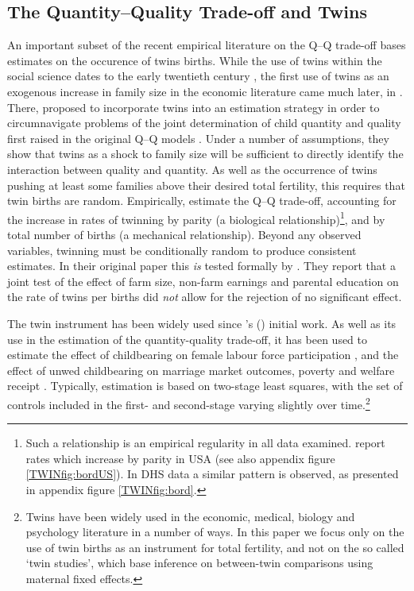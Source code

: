 \documentclass[subeqn]{article}
\begin{document}
\begin{spacing}{1.4}
\subsection{The Quantity--Quality Trade-off and Twins}
An important subset of the recent empirical literature on the Q--Q trade-off
bases estimates on the occurence of twins births.  While the use of twins within
the social science dates to the early twentieth century \citep{Thorndike1905}, the
first use of twins as an exogenous increase in family size in the economic
literature came much later, in \citet{RosenzweigWolpin1980}. There,
\citet{RosenzweigWolpin1980} proposed to incorporate twins into an estimation
strategy in order to circumnavigate problems of the joint determination of child 
quantity and quality first raised in the original Q--Q models \citep{BeckerLewis1973,
Willis1973,DeTray1973,BeckerTomes1976}.  Under a number of assumptions, they show 
that twins as a shock to family size will be sufficient to directly identify the 
interaction between quality and quantity.  As well as the occurrence of twins 
pushing at least some families above their desired total fertility, this requires 
that twin births are random.  Empirically, \citet{RosenzweigWolpin1980} 
estimate the Q--Q trade-off, accounting for the increase in rates of twinning by 
parity (a biological relationship)\footnote{Such a relationship is an empirical
  regularity in all data examined. \citet{RosenzweigWolpin1980} report rates which
  increase by parity in USA (see also appendix figure \ref{TWINfig:bordUS}).  In
  DHS data a similar pattern is observed, as presented in appendix figure
  \ref{TWINfig:bord}.}, and by total number of births (a mechanical relationship).
Beyond any observed variables, twinning must be conditionally random to produce
consistent estimates. In their original paper this \emph{is} tested formally by
\citet{RosenzweigWolpin1980}.  They report that a joint test of the effect of
farm size, non-farm earnings and parental education on the rate of twins per
births did \emph{not} allow for the rejection of no significant effect.

The twin instrument has been widely used since \citeauthor{RosenzweigWolpin1980}'s
(\citeyear{RosenzweigWolpin1980}) initial work. As well as its use in the 
estimation of the quantity-quality trade-off, it has been used to estimate the
effect of childbearing on female labour force participation
\citep{RosenzweigWolpin1980b,Jacobsenetal1999,AngristEvans1998}, and the effect 
of unwed childbearing on marriage market outcomes, poverty and welfare receipt 
\citep{BronarsGrogger1994}.  Typically, estimation is based on two-stage least
squares, with the set of controls included in the first- and second-stage 
varying slightly over time.\footnote{Twins have been widely used in the economic, 
medical, biology and psychology literature in a number of ways.  In this paper 
we focus only on the use of twin births as an instrument for total fertility, 
and not on the so called `twin studies', which base inference on between-twin 
comparisons using maternal fixed effects.}


\end{spacing}
\end{document}

